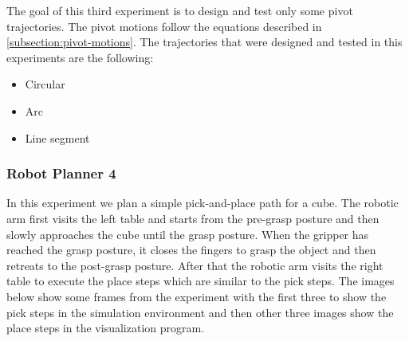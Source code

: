 The goal of this third experiment is to design and test only some pivot trajectories. The pivot motions follow the equations described in 
\ref{subsection:pivot-motions}. The trajectories that were designed and tested in this experiments are the following:
\begin{itemize}
\item Circular
\item Arc
\item Line segment
\end{itemize}

\subsubsection{Robot Planner 4}

In this experiment we plan a simple pick-and-place path for a cube. The robotic arm first visits the left table and starts from the pre-grasp posture and then 
slowly approaches the cube until the grasp posture. When the gripper has reached the grasp posture, it closes the fingers to grasp the object and then retreats 
to the post-grasp posture. After that the robotic arm visits the right table to execute the place steps which are similar to the pick steps. The images below 
show some frames from the experiment with the first three to show the pick steps in the simulation environment and then other three images show the place steps 
in the visualization program.

